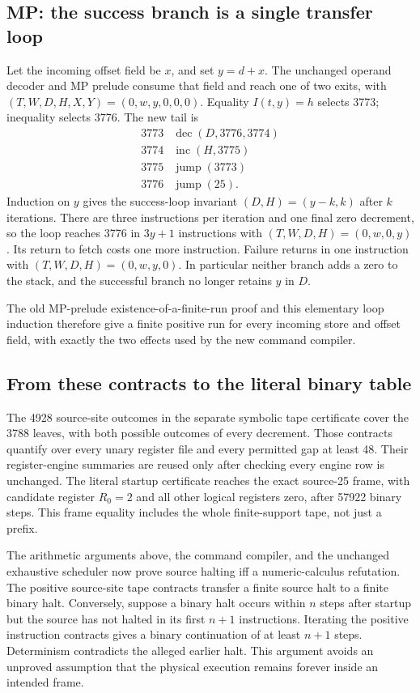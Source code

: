 \subsection{MP: the success branch is a single transfer loop}

Let the incoming offset field be $x$, and set $y=d+x$.  The unchanged
operand decoder and MP prelude consume that field and reach one of two
exits, with $(T,W,D,H,X,Y)=(0,w,y,0,0,0)$.  Equality
$I(t,y)=h$ selects 3773; inequality selects 3776.  The new tail is
\[
\begin{array}{r|l}
3773&\operatorname{dec}(D,3776,3774)\\
3774&\operatorname{inc}(H,3775)\\
3775&\operatorname{jump}(3773)\\
3776&\operatorname{jump}(25).
\end{array}
\]
Induction on $y$ gives the success-loop invariant
$(D,H)=(y-k,k)$ after $k$ iterations.  There are three instructions per
iteration and one final zero decrement, so the loop reaches 3776 in
$3y+1$ instructions with $(T,W,D,H)=(0,w,0,y)$.  Its return to fetch costs
one more instruction.  Failure returns in one instruction with
$(T,W,D,H)=(0,w,y,0)$.  In particular neither branch adds a zero to the
stack, and the successful branch no longer retains $y$ in $D$.

The old MP-prelude existence-of-a-finite-run proof and this elementary loop
induction therefore give a finite positive run for every incoming store and
offset field, with exactly the two effects used by the new command compiler.

\subsection{From these contracts to the literal binary table}

The 4928 source-site outcomes in the separate symbolic tape certificate
cover the 3788 leaves, with both possible outcomes of every decrement.
Those contracts quantify over every unary register file and every permitted
gap at least 48.  Their register-engine summaries are reused only after
checking every engine row is unchanged.  The literal startup certificate
reaches the exact source-25 frame, with candidate register $R_0=2$ and all
other logical registers zero, after 57922 binary steps.  This frame equality
includes the whole finite-support tape, not just a prefix.

The arithmetic arguments above, the command compiler, and the unchanged
exhaustive scheduler now prove source halting iff a numeric-calculus
refutation.  The positive source-site tape contracts transfer a finite
source halt to a finite binary halt.  Conversely, suppose a binary halt
occurs within $n$ steps after startup but the source has not halted in its
first $n+1$ instructions.  Iterating the positive instruction contracts
gives a binary continuation of at least $n+1$ steps.  Determinism contradicts
the alleged earlier halt.  This argument avoids an unproved assumption
that the physical execution remains forever inside an intended frame.

